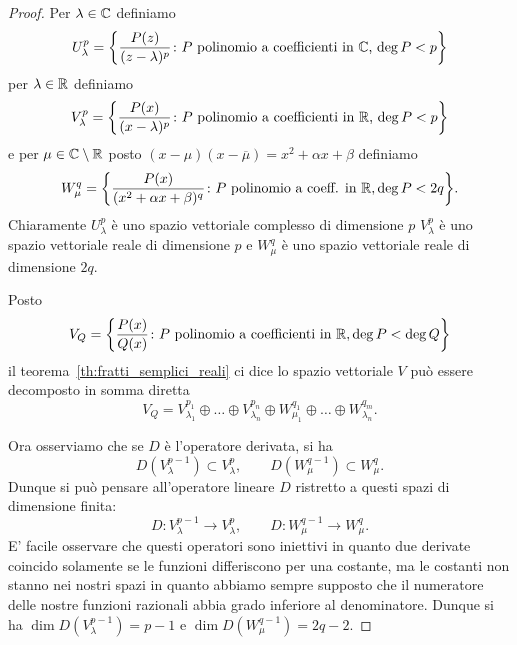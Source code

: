 \begin{proof}
Per $\lambda\in \mathbb C$ definiamo
\[
  U_\lambda^p = {\left\{ \frac{P(z)}{(z-\lambda)^p}\colon \text{$P$ polinomio a coefficienti in $\mathbb C$, $\deg P < p$} \right\}}
\]
per $\lambda \in \mathbb R$ definiamo
\[
  V_\lambda^p = {\left\{ \frac{P(x)}{(x-\lambda)^p}\colon \text{$P$ polinomio a coefficienti in $\mathbb R$, $\deg P<p$} \right\}}
\]
e per $\mu\in \mathbb C\setminus \mathbb R$
posto $(x-\mu)(x-\overline \mu) = x^2 + \alpha x + \beta$
definiamo
\[
  W_\mu^q = {\left\{ \frac{P(x)}{(x^2+\alpha x + \beta)^q}\colon
  \text{$P$ polinomio a coeff. in $\mathbb R$}, \deg P < 2q \right\}}.
\]
Chiaramente $U_\lambda^p$ è uno spazio vettoriale complesso
di dimensione $p$
$V_\lambda^p$ è uno spazio vettoriale
reale di dimensione $p$
e $W_\mu^q$ è uno spazio vettoriale
reale di dimensione $2q$.

Posto
\[
  V_Q = {\left\{ \frac{P(x)}{Q(x)}\colon \text{$P$ polinomio a coefficienti
  in $\mathbb R$}, \deg P < \deg Q \right\}}
\]
il teorema~\ref{th:fratti_semplici_reali} ci dice lo spazio vettoriale
$V$ può essere decomposto in somma diretta
\begin{equation}\label{eq:47748393}
  V_Q = V_{\lambda_1}^{p_1} \oplus \dots \oplus V_{\lambda_n}^{p_n}
  \oplus W_{\mu_1}^{q_1} \oplus \dots \oplus W_{\lambda_n}^{q_m}.
\end{equation}

Ora osserviamo che se $D$ è l'operatore derivata, si ha
\[
  D(V_\lambda^{p-1}) \subset V_\lambda^p,
  \qquad  D(W_\mu^{q-1}) \subset W_\mu^q.
\]
Dunque si può pensare all'operatore lineare $D$
ristretto a questi spazi di dimensione
finita:
\[
  D \colon V_\lambda^{p-1} \to V_\lambda^p,
  \qquad
  D \colon W_\mu^{q-1} \to W_\mu^q.
\]
E' facile osservare che questi operatori sono iniettivi in quanto
due derivate coincido solamente se le funzioni differiscono per una costante,
ma le costanti non stanno nei nostri spazi in quanto
abbiamo sempre supposto che il numeratore delle nostre funzioni razionali abbia grado inferiore al denominatore.
Dunque si ha $\dim D(V_\lambda^{p-1})=p-1$ e $\dim D(W_\mu^{q-1})=2q-2$.


\end{proof}
